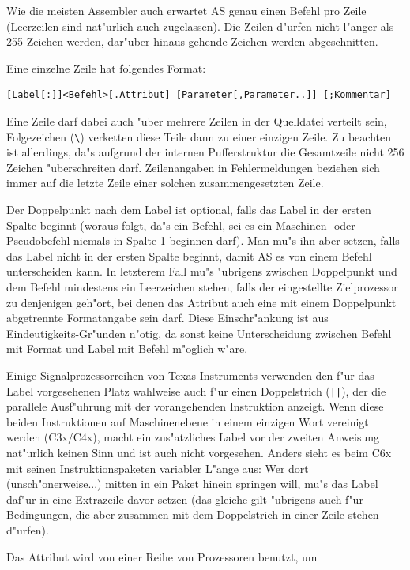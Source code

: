 \documentclass[12pt,a4paper,twoside]{report}
\newcommand{\asname}{AS}
\begin{document}
Wie die meisten Assembler auch erwartet \asname{} genau einen Befehl pro Zeile
(Leerzeilen sind nat"urlich auch zugelassen).  Die Zeilen d"urfen nicht
l"anger als 255 Zeichen werden, dar"uber hinaus gehende Zeichen werden
abgeschnitten.
\par
Eine einzelne Zeile hat folgendes Format:
\begin{verbatim}
[Label[:]]<Befehl>[.Attribut] [Parameter[,Parameter..]] [;Kommentar]
\end{verbatim}
Eine Zeile darf dabei auch "uber mehrere Zeilen in der Quelldatei
verteilt sein, Folgezeichen (\verb!\!) verketten diese Teile dann zu
einer einzigen Zeile.  Zu beachten ist allerdings, da"s aufgrund der
internen Pufferstruktur die Gesamtzeile nicht 256 Zeichen "uberschreiten
darf.  Zeilenangaben in Fehlermeldungen beziehen sich immer auf die
letzte Zeile einer solchen zusammengesetzten Zeile.
\par
Der Doppelpunkt nach dem Label ist optional, falls das Label in der
ersten Spalte beginnt (woraus folgt, da"s ein Befehl, sei es ein
Maschinen- oder Pseudobefehl niemals in Spalte 1 beginnen darf).
Man mu"s ihn aber setzen, falls das Label nicht in der ersten Spalte
beginnt, damit \asname{} es von einem Befehl unterscheiden kann.  In letzterem
Fall mu"s "ubrigens zwischen Doppelpunkt und dem Befehl mindestens ein
Leerzeichen stehen, falls der eingestellte Zielprozessor zu denjenigen
geh"ort, bei denen das Attribut auch eine mit einem Doppelpunkt
abgetrennte Formatangabe sein darf.  Diese Einschr"ankung ist aus
Eindeutigkeits-Gr"unden n"otig, da sonst keine Unterscheidung zwischen
Befehl mit Format und Label mit Befehl m"oglich w"are.
\par
Einige Signalprozessorreihen von Texas Instruments verwenden den f"ur das
Label vorgesehenen Platz wahlweise auch f"ur einen Doppelstrich
(\verb!||!), der die parallele Ausf"uhrung mit der vorangehenden
Instruktion anzeigt.  Wenn diese beiden Instruktionen auf Maschinenebene
in einem einzigen Wort vereinigt werden (C3x/C4x), macht ein zus"atzliches
Label vor der zweiten Anweisung nat"urlich keinen Sinn und ist auch nicht
vorgesehen.  Anders sieht es beim C6x mit seinen Instruktionspaketen
variabler L"ange aus: Wer dort (unsch"onerweise...) mitten in ein Paket
hinein springen will, mu"s das Label daf"ur in eine Extrazeile davor setzen
(das gleiche gilt "ubrigens auch f"ur Bedingungen, die aber zusammen mit
dem Doppelstrich in einer Zeile stehen d"urfen).
\par
Das Attribut wird von einer Reihe von Prozessoren benutzt, um
\end{document}
